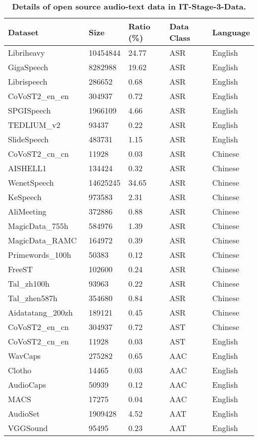 \begin{table}[h]
\centering
\caption{\textbf{Details of open source audio-text data in IT-Stage-3-Data.}
}
\label{tab:appendix_audio_text}
\setlength{\tabcolsep}{7pt}
\begin{tabular}{l|l|l|l|l}
\toprule
Dataset                         & Size    & Ratio (\%) & Data Class    & Language        \\
\midrule
Libriheavy~\cite{Libriheavy} & 10454844 & 24.77 &ASR &English \\
GigaSpeech~\cite{GigaSpeech} & 8282988 & 19.62 &ASR &English \\
Librispeech~\cite{Librispeech} & 286652 & 0.68 &ASR &English \\
CoVoST2\_en\_en~\cite{CoVoST2} & 304937 & 0.72 &ASR &English \\
SPGISpeech~\cite{SPGISpeech} & 1966109 & 4.66 &ASR &English \\
TEDLIUM\_v2~\cite{TED_LIUM} & 93437 & 0.22 &ASR &English \\
SlideSpeech~\cite{SlideSpeech} & 483731 & 1.15 &ASR &English \\
CoVoST2\_cn\_cn~\cite{CoVoST2} & 11928 & 0.03 &ASR &Chinese \\
AISHELL1~\cite{AISHELL1} & 134424 & 0.32 &ASR &Chinese \\
WenetSpeech~\cite{WenetSpeech} & 14625245 & 34.65 &ASR &Chinese \\
KeSpeech~\cite{KeSpeech} & 973583 & 2.31 &ASR &Chinese \\
AliMeeting~\cite{AliMeeting} & 372886 & 0.88 &ASR &Chinese \\
MagicData\_755h~\cite{MagicData_RAMC} & 584976 & 1.39 &ASR &Chinese \\
MagicData\_RAMC~\cite{MagicData_RAMC} & 164972 & 0.39 &ASR &Chinese \\
Primewords\_100h~\cite{Primewords_100h} & 50383 & 0.12 &ASR &Chinese \\
FreeST~\cite{FreeST} & 102600 & 0.24 &ASR &Chinese \\
Tal\_zh100h~\cite{TAL} & 93963 & 0.22 &ASR &Chinese \\
Tal\_zhen587h~\cite{TAL} & 354680 & 0.84 &ASR &Chinese \\
Aidatatang\_200zh~\cite{aidatatang_200zh} & 189121 & 0.45 &ASR &Chinese \\
CoVoST2\_en\_cn~\cite{CoVoST2} & 304937 & 0.72 &AST &Chinese \\
CoVoST2\_cn\_en~\cite{CoVoST2} & 11928 & 0.03 &AST &English \\
WavCaps~\cite{WavCaps} & 275282 & 0.65 &AAC &English \\
Clotho~\cite{Clotho} & 14465   & 0.03     &AAC    & English         \\
AudioCaps~\cite{AudioCaps} & 50939 & 0.12 &AAC &English \\
MACS~\cite{MACS} & 17275 & 0.04 &AAC &English \\
AudioSet~\cite{AudioSet} & 1909428 & 4.52 &AAT &English \\
VGGSound~\cite{VGGSound} & 95495 & 0.23 &AAT &English \\
\bottomrule
\end{tabular}
\end{table}


